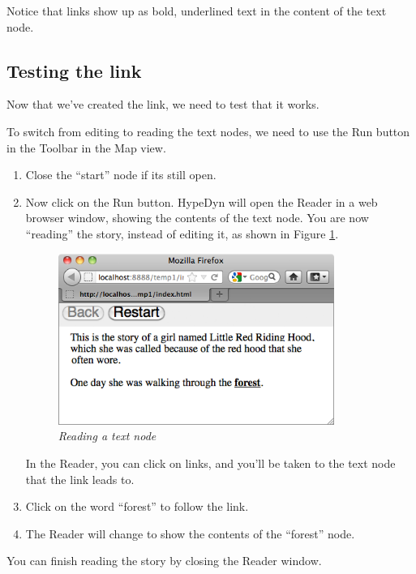 \documentclass{article}
\begin{document}
Notice that links show up as bold, underlined text in the content of the text node.

\subsection{Testing the link}

Now that we've created the link, we need to test that it works.

To switch from editing to reading the text nodes, we need to use the Run button
in the Toolbar in the Map view.

\begin{enumerate}
  \item Close the ``start'' node if its still open.
  \item Now click on the Run button. HypeDyn will open the Reader in a web
  browser window, showing the contents of the text node. You are now
  ``reading'' the story, instead of editing it, as shown in Figure
  \ref{fig:reading}.

\begin{figure}[ht]
  \centering
  \includegraphics[width=9cm]{images/hypedyn-tutorial-1-figure-10}
  \caption{\textit{Reading a text node}}
  \label{fig:reading}
\end{figure} 

In the Reader, you can click on links, and you'll be taken to the text node
that the link leads to.

\item Click on the word ``forest'' to follow the link.
\item The Reader will change to show the contents of the ``forest'' node.
\end{enumerate}

You can finish reading the story by closing the Reader window.

\end{document}
